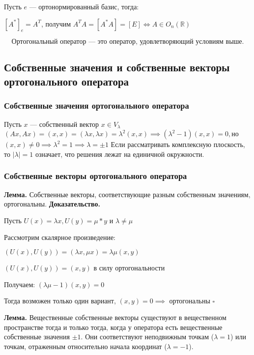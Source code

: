 \documentclass[12pt]{article}
\begin{document}
Пусть $e$ — ортонормированный базис, тогда:

$[A^*]_e = A^T$, получим $A^TA = [A^*A] = [E] \Longleftrightarrow A \in O_n(\mathbb{R})$

$$
\boxed{
\text{Ортогональный оператор — это оператор, удовлетворяющий условиям выше.}
}
$$
\subsection{Собственные значения и собственные векторы ортогонального оператора}
\subsubsection{Собственные значения ортогонального оператора}
Пусть $x$ — собственный вектор $x \in V_\lambda$ \newline
$(Ax, Ax) = (x,x) = (\lambda x, \lambda x) = \lambda^2(x,x) \implies (\lambda^2 - 1)(x,x) = 0,$\newline но $(x,x) \ne 0 \implies \lambda^2 = 1 \implies \lambda = \pm 1$\newline
Если рассматривать комплексную плоскость, то $|\lambda| = 1$ означает, что решения лежат на единичной окружности.

\subsubsection{Собственные векторы ортогонального оператора}
\textbf{Лемма.}\newline
Собственные векторы, соответствующие разным собственным значениям, ортогональны.\newline
\textbf{Доказательство.}

Пусть $U(x) = \lambda x, U(y)= \mu *y $ и $\lambda \ne \mu$

Рассмотрим скалярное произведение:

$(U(x),U(y)) = (\lambda x, \mu x) = \lambda \mu (x,y)$

$(U(x),U(y)) = (x,y)$ в силу ортогональности

Получаем: $(\lambda \mu - 1)(x,y) = 0$

Тогда возможен только один вариант, $(x,y) = 0 \implies $ ортогональны $\square$

\textbf{Лемма.}\newline
Вещественные собственные векторы существуют в вещественном пространстве тогда и только тогда, когда у оператора есть вещественные собственные значения $\pm 1$. Они соответствуют неподвижным точкам ($\lambda = 1$) или точкам, отраженным относительно начала координат ($\lambda = -1$).
\end{document}
